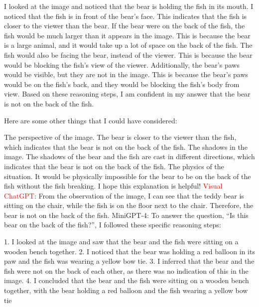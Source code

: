 \begin{enumerate}
        I looked at the image and noticed that the bear is holding the fish in its mouth.
        I noticed that the fish is in front of the bear's face. This indicates that the fish is closer to the viewer than the bear.
        If the bear were on the back of the fish, the fish would be much larger than it appears in the image. This is because the bear is a large animal, and it would take up a lot of space on the back of the fish.
        The fish would also be facing the bear, instead of the viewer. This is because the bear would be blocking the fish's view of the viewer.
        Additionally, the bear's paws would be visible, but they are not in the image. This is because the bear's paws would be on the fish's back, and they would be blocking the fish's body from view.
        Based on these reasoning steps, I am confident in my answer that the bear is not on the back of the fish.
        
        Here are some other things that I could have considered:
        
        The perspective of the image. The bear is closer to the viewer than the fish, which indicates that the bear is not on the back of the fish.
        The shadows in the image. The shadows of the bear and the fish are cast in different directions, which indicates that the bear is not on the back of the fish.
        The physics of the situation. It would be physically impossible for the bear to be on the back of the fish without the fish breaking.
        I hope this explanation is helpful!
        \subitem \textcolor{red}{Visual ChatGPT}: From the observation of the image, I can see that the teddy bear is sitting on the chair, while the fish is on the floor next to the chair. Therefore, the bear is not on the back of the fish.
        \subitem MiniGPT-4: To answer the question, “Is this bear on the back of the fish?”, I followed these specific reasoning steps:

        1. I looked at the image and saw that the bear and the fish were sitting on a wooden bench together.
        2. I noticed that the bear was holding a red balloon in its paw and the fish was wearing a yellow bow tie.
        3. I inferred that the bear and the fish were not on the back of each other, as there was no indication of this in the image.
        4. I concluded that the bear and the fish were sitting on a wooden bench together, with the bear holding a red balloon and the fish wearing a yellow bow tie
    \end{enumerate}
